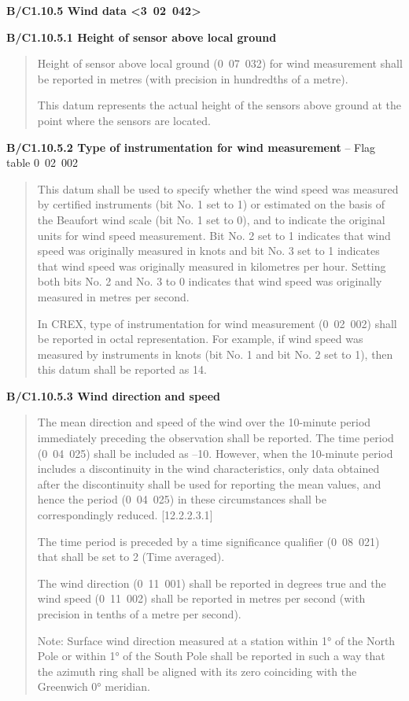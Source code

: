 \textbf{B/C1.10.5 Wind data \textless3~02~042\textgreater{}}

\textbf{B/C1.10.5.1 Height of sensor above local ground}

\begin{quote}
Height of sensor above local ground (0~07~032) for wind measurement shall be reported in metres (with precision in hundredths of a metre).

This datum represents the actual height of the sensors above ground at the point where the sensors are located.
\end{quote}

\textbf{B/C1.10.5.2 Type of instrumentation for wind measurement} -- Flag table 0~02~002

\begin{quote}
This datum shall be used to specify whether the wind speed was measured by certified instruments (bit No. 1 set to 1) or estimated on the basis of the Beaufort wind scale (bit No. 1 set to 0), and to indicate the original units for wind speed measurement. Bit No. 2 set to 1 indicates that wind speed was originally measured in knots and bit No. 3 set to 1 indicates that wind speed was originally measured in kilometres per hour. Setting both bits No. 2 and No. 3 to 0 indicates that wind speed was originally measured in metres per second.

In CREX, type of instrumentation for wind measurement (0~02~002) shall be reported in octal representation. For example, if wind speed was measured by instruments in knots (bit No. 1 and bit No. 2 set to 1), then this datum shall be reported as 14.
\end{quote}

\textbf{B/C1.10.5.3 Wind direction} \textbf{and speed}

\begin{quote}
The mean direction and speed of the wind over the 10-minute period immediately preceding the observation shall be reported. The time period (0~04~025) shall be included as --10. However, when the 10-minute period includes a discontinuity in the wind characteristics, only data obtained after the discontinuity shall be used for reporting the mean values, and hence the period (0~04~025) in these circumstances shall be correspondingly reduced. {[}12.2.2.3.1{]}

The time period is preceded by a time significance qualifier (0~08~021) that shall be set to 2 (Time averaged).

The wind direction (0~11~001) shall be reported in degrees true and the wind speed (0~11~002) shall be reported in metres per second (with precision in tenths of a metre per second).

Note: Surface wind direction measured at a station within 1° of the North Pole or within 1° of the South Pole shall be reported in such a way that the azimuth ring shall be aligned with its zero coinciding with the Greenwich 0° meridian.
\end{quote}

